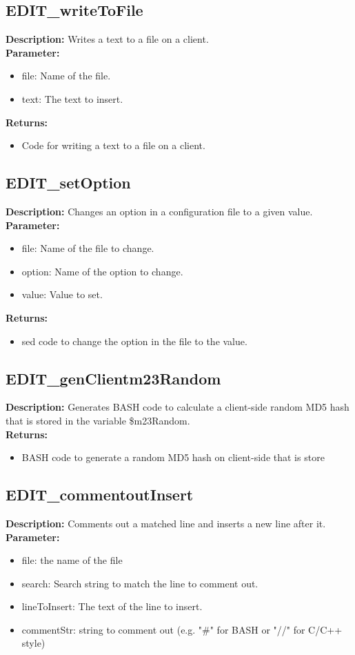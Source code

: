 \subsection{EDIT\_writeToFile}
\textbf{Description:} Writes a text to a file on a client.\\
\textbf{Parameter:}
\begin{itemize}
\item file: Name of the file.
\item text: The text to insert.
\end{itemize}
\textbf{Returns:}
\begin{itemize}
\item Code for writing a text to a file on a client.
\end{itemize}

\subsection{EDIT\_setOption}
\textbf{Description:} Changes an option in a configuration file to a given value.\\
\textbf{Parameter:}
\begin{itemize}
\item file: Name of the file to change.
\item option: Name of the option to change.
\item value: Value to set.
\end{itemize}
\textbf{Returns:}
\begin{itemize}
\item sed code to change the option in the file to the value.
\end{itemize}

\subsection{EDIT\_genClientm23Random}
\textbf{Description:} Generates BASH code to calculate a client-side random MD5 hash that is stored in the variable \$m23Random.\\
\textbf{Returns:}
\begin{itemize}
\item BASH code to generate a random MD5 hash on client-side that is store
\end{itemize}

\subsection{EDIT\_commentoutInsert}
\textbf{Description:} Comments out a matched line and inserts a new line after it.\\
\textbf{Parameter:}
\begin{itemize}
\item file: the name of the file
\item search: Search string to match the line to comment out.
\item lineToInsert: The text of the line to insert.
\item commentStr: string to comment out (e.g. "\#" for BASH or "//" for C/C++ style)
\end{itemize}

